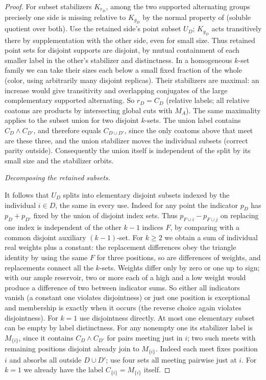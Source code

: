 \begin{proof}

For subset stabilizers \(K_{r_D}\), among the two supported alternating groups precisely one side is
missing relative to \(K_{g_D}\) by the normal property of  (soluble quotient over
both). Use the retained side's point subset \(U_D\); \(K_{g_D}\) acts transitively there by
supplementation with the other side, even for small size. Thus retained point sets for disjoint supports
are disjoint, by mutual containment of each smaller label in the other's stabilizer and distinctness. In
a homogeneous \(k\)-set family we can take their sizes each below a small fixed fraction of the whole
(color, using arbitrarily many disjoint replicas). Their stabilizers are maximal: an increase would give
transitivity and overlapping conjugates of the large complementary supported alternating. So \(r_D=C_D\)
(relative labels; all relative coatoms are products by intersecting global cuts with \(M_A\)). The same
maximality applies to the subset union for two disjoint \(k\)-sets. The union label contains \(C_D\wedge
C_{D'}\), and therefore equals \(C_{D\cup D'}\), since the only coatoms above that meet are these three,
and the union stabilizer moves the individual subsets (correct parity outside). Consequently the union
itself is independent of the split by its small size and the stabilizer orbits.

\smallskip\noindent\emph{Decomposing the retained subsets.}

It follows that \(U_D\) splits into elementary disjoint subsets indexed by the individual \(i\in D\), the
same in every use. Indeed for any point the indicator \(p_D\) has \(p_D+p_{D'}\) fixed by the union of
disjoint index sets. Thus \(p_{F\cup i}-p_{F\cup j}\) on replacing one index is independent of the other
\(k-1\) indices \(F\), by comparing with a common disjoint auxiliary \((k-1)\)-set. For \(k\ge2\) we
obtain a sum of individual real weights plus a constant: the replacement differences obey the triangle
identity by using the same \(F\) for three positions, so are differences of weights, and replacements
connect all the \(k\)-sets. Weights differ only by zero or one up to sign; with our ample reservoir, two
or more each of a high and a low weight would produce a difference of two between indicator sums. So
either all indicators vanish (a constant one violates disjointness) or just one position is exceptional
and membership is exactly when it occurs (the reverse choice again violates disjointness). For \(k=1\)
use disjointness directly. At most one elementary subset can be empty by label distinctness. For any
nonempty one its stabilizer label is \(M_{\{i\}}\), since it contains \(C_D\wedge C_{D'}\) for pairs
meeting just in \(i\); two such meets with remaining positions disjoint already join to \(M_{\{i\}}\).
Indeed each meet fixes position \(i\) and absorbs all outside \(D\cup D'\); use four sets all meeting
pairwise just at \(i\). For \(k=1\) we already have the label \(C_{\{i\}}=M_{\{i\}}\) itself.


\end{proof}
